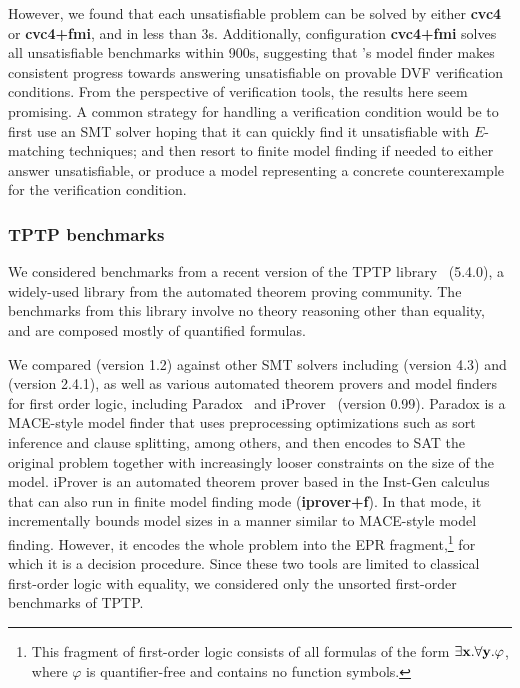 \documentclass{svjour3}                     %
\begin{document}
However, we found that each unsatisfiable problem can be solved 
by either {\bf cvc4} or {\bf cvc4+fmi}, and in less than 3s.
Additionally, configuration {\bf cvc4+fmi} solves all unsatisfiable benchmarks 
within 900s, suggesting that \cvc's model finder makes consistent progress
towards answering unsatisfiable on provable DVF verification conditions.
From the perspective of verification tools, the results here seem promising.
A common strategy for handling a verification condition would be 
to first use an SMT solver hoping that it can quickly find it unsatisfiable 
with $E$-matching techniques;
and then resort to finite model finding if needed 
to either answer unsatisfiable, or produce a model representing 
a concrete counterexample for the verification condition.

\subsubsection*{TPTP benchmarks}

We considered benchmarks from a recent version of the TPTP library~\cite{Sut-JAR-09} (5.4.0), 
a widely-used library from the automated theorem proving community.
The benchmarks from this library involve no theory reasoning other than equality,
and are composed mostly of quantified formulas.

We compared \cvc (version 1.2) against other SMT solvers including \ziii (version 4.3) and \cvciii (version 2.4.1), 
as well as various automated theorem provers and model finders for first order logic, 
including Paradox~\cite{Claessen:Soerensson:MACEimprove:ModelComputationWS:2003} and 
iProver~\cite{Kor08-IJCAR} (version 0.99).
Paradox is a MACE-style model finder that uses preprocessing optimizations 
such as sort inference and clause splitting, among others, and
then encodes to SAT the original problem together with increasingly 
looser constraints on the size of the model.
iProver is an automated theorem prover based in the Inst-Gen calculus
that can also run in finite model finding mode ({\bf iprover+f}).
In that mode, it incrementally bounds model sizes 
in a manner similar to MACE-style model finding.
However, it encodes the whole problem into the EPR fragment,\footnote{
This fragment of first-order logic consists of all formulas of the form 
$\exists \mathbf{x}. \forall \mathbf{y}. \varphi$, 
where $\varphi$ is quantifier-free and contains no function symbols.}
for which it is a decision procedure.
Since these two tools are limited to classical first-order logic with equality, 
we considered only the unsorted first-order benchmarks of TPTP.
\end{document}
